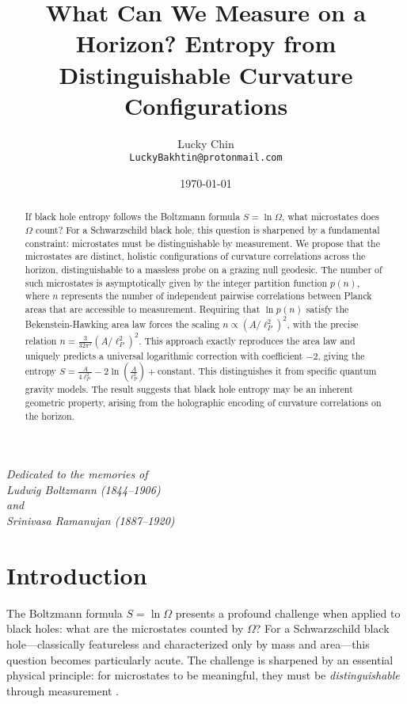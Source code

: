\documentclass[12pt, letterpaper]{article}
\title{What Can We Measure on a Horizon? Entropy from Distinguishable Curvature Configurations}
\author{Lucky Chin \\ \texttt{LuckyBakhtin@protonmail.com}}
\date{\today}
\begin{document}
\maketitle

\begin{center}
    \textit{Dedicated to the memories of \\
    Ludwig Boltzmann (1844--1906) \\
    and \\
    Srinivasa Ramanujan (1887--1920)}
\end{center}
\vspace{0.5cm} %

\begin{abstract}
If black hole entropy follows the Boltzmann formula $S = \ln \Omega$, what microstates does $\Omega$ count? For a Schwarzschild black hole, this question is sharpened by a fundamental constraint: microstates must be distinguishable by measurement.
We propose that the microstates are distinct, holistic configurations of curvature correlations across the horizon, distinguishable to a massless probe on a grazing null geodesic. The number of such microstates is asymptotically given by the integer partition function $p(n)$, where $n$ represents the number of independent pairwise correlations between Planck areas that are accessible to measurement. Requiring that $\ln p(n)$ satisfy the Bekenstein-Hawking area law forces the scaling $n \propto (A/\ell_P^2)^2$, with the precise relation $n = \frac{3}{32\pi^2} (A/\ell_P^2)^2$. This approach exactly reproduces the area law and uniquely predicts a universal logarithmic correction with coefficient $-2$, giving the entropy $S = \frac{A}{4\ell_P^2} - 2\ln\left( \frac{A}{\ell_P^2} \right) + \text{constant}$. This distinguishes it from specific quantum gravity models. The result suggests that black hole entropy may be an inherent geometric property, arising from the holographic encoding of curvature correlations on the horizon.
\end{abstract}

\section{Introduction}

The Boltzmann formula $S = \ln \Omega$ presents a profound challenge when applied to black holes: what are the microstates counted by $\Omega$? For a Schwarzschild black hole—classically featureless and characterized only by mass and area—this question becomes particularly acute. The challenge is sharpened by an essential physical principle: for microstates to be meaningful, they must be \emph{distinguishable} through measurement \cite{Bekenstein1972, Bekenstein1973}.
\end{document}
